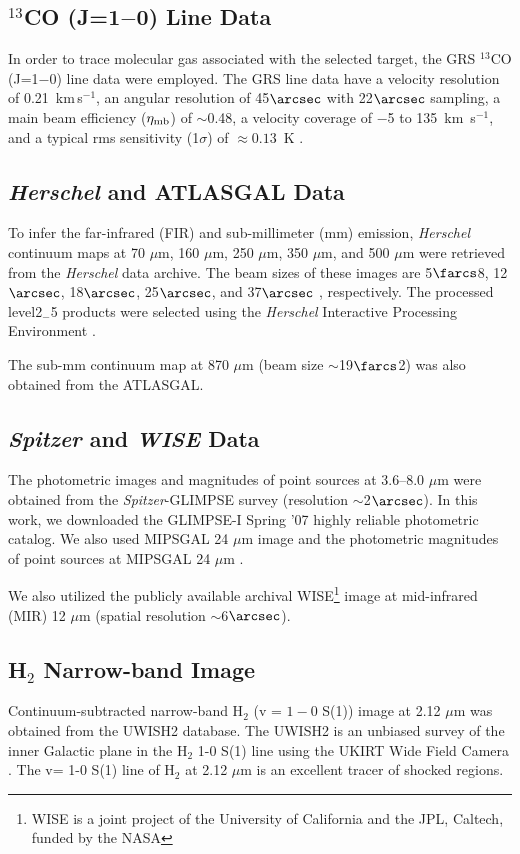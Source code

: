 \documentclass[iop]{emulateapj}
\begin{document}
\subsection{$^{13}$CO (J=1$-$0) Line Data}
In order to trace molecular gas associated with the selected target, 
the GRS $^{13}$CO (J=1$-$0) line data were employed. 
The GRS line data have a velocity resolution of 0.21~km\,s$^{-1}$, an angular resolution 
of 45$\arcsec$ with 22$\arcsec$ sampling, a main beam efficiency ($\eta_{\rm mb}$) of $\sim$0.48, 
a velocity coverage of $-$5 to 135~km~s$^{-1}$, and a typical rms sensitivity (1$\sigma$)
of $\approx0.13$~K \citep{jackson06}.  
%
\subsection{{\it Herschel} and ATLASGAL Data}
%
To infer the far-infrared (FIR) and sub-millimeter (mm) emission, 
{\it Herschel} continuum maps at 70 $\mu$m, 160 $\mu$m, 250 $\mu$m, 350 $\mu$m, and 500 $\mu$m were retrieved 
from the {\it Herschel} data archive. The beam sizes of these images are 5$\farcs$8, 12$\arcsec$, 18$\arcsec$, 25$\arcsec$, and 37$\arcsec$ \citep{poglitsch10,griffin10}, respectively. The processed level2$_{-}$5 products were selected using the {\it Herschel} Interactive Processing 
Environment \citep[HIPE,][]{ott10}. 

The sub-mm continuum map at 870 $\mu$m (beam size $\sim$19$\farcs$2) was also obtained from the ATLASGAL. 
%
\subsection{{\it Spitzer} and {\it WISE} Data}
%
The photometric images and magnitudes of point sources at 3.6--8.0 $\mu$m were obtained 
from the {\it Spitzer}-GLIMPSE survey (resolution $\sim$2$\arcsec$). 
In this work, we downloaded the GLIMPSE-I Spring '07 highly reliable photometric catalog. 
We also used MIPSGAL 24 $\mu$m image and the photometric magnitudes of point sources at MIPSGAL 24 $\mu$m \citep[from][]{gutermuth15}. 

We also utilized the publicly available archival WISE\footnote[1]{WISE is a joint project of the
University of California and the JPL, Caltech, funded by the NASA} image at mid-infrared (MIR) 12 $\mu$m 
(spatial resolution $\sim$6$\arcsec$). 
%
\subsection{H$_{2}$ Narrow-band Image}
%
Continuum-subtracted narrow-band H$_{2}$ (v = $1-0$ S(1)) image at 2.12 $\mu$m 
was obtained from the UWISH2 database. 
The UWISH2 is an unbiased survey of the inner Galactic plane in the H$_{2}$ 1-0 S(1) line using 
the UKIRT Wide Field Camera \citep[WFCAM;][]{casali07}. 
The v= 1-0 S(1) line of H$_{2}$ at 2.12 $\mu$m is an excellent tracer of shocked regions. 
%
\end{document}
